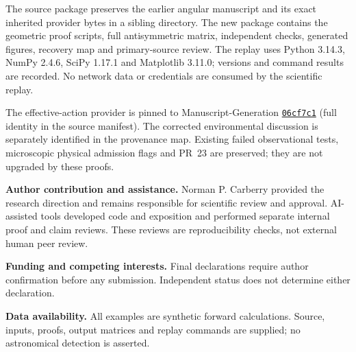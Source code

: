 \documentclass[11pt,a4paper]{article}
\begin{document}
The source package preserves the earlier angular manuscript and its
exact inherited provider bytes in a sibling directory. The new package
contains the geometric proof scripts, full antisymmetric matrix,
independent checks, generated figures, recovery map and primary-source
review. The replay uses Python 3.14.3, NumPy 2.4.6, SciPy 1.17.1 and
Matplotlib 3.11.0; versions and command results are recorded. No network
data or credentials are consumed by the scientific replay.

The effective-action provider is pinned to Manuscript-Generation
\href{https://github.com/ncarberry64/Manuscript-Generation/commit/06cf7c1b85d6605bfee0cc0d07fb2af86a66cae9}{\texttt{06cf7c1}} (full identity in the source manifest). The corrected
environmental discussion is separately identified in the provenance
map. Existing failed observational tests, microscopic physical admission
flags and PR~23 are preserved; they are not upgraded by these proofs.

\noindent\textbf{Author contribution and assistance.} Norman P. Carberry
provided the research direction and remains responsible for scientific
review and approval. AI-assisted tools developed code and exposition
and performed separate internal proof and claim reviews. These reviews
are reproducibility checks, not external human peer review.

\noindent\textbf{Funding and competing interests.} Final declarations
require author confirmation before any submission. Independent status
does not determine either declaration.

\noindent\textbf{Data availability.} All examples are synthetic forward
calculations. Source, inputs, proofs, output matrices and replay commands
are supplied; no astronomical detection is asserted.

\begingroup{}

\endgroup
\end{document}
